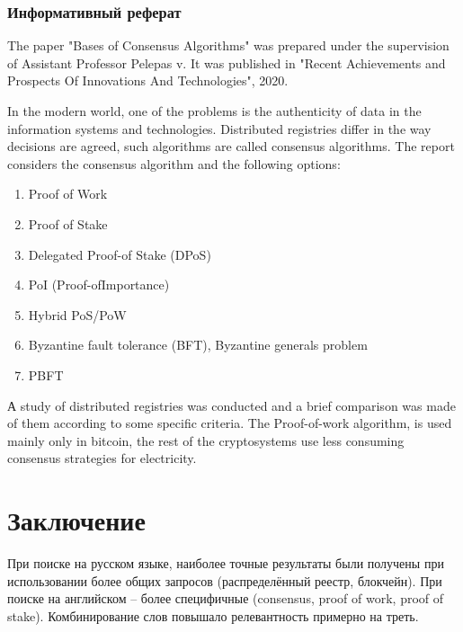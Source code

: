 \documentclass[a4paper, 12pt]{report}		%
\begin{document}
\subsection*{Информативный реферат}
The paper "Bases of Consensus Algorithms" was prepared under the supervision of Assistant Professor Pelepas v. It was published in "Recent Achievements and Prospects Of Innovations And Technologies", 2020.

In the modern world, one of the problems is the authenticity of data in
the information systems and technologies. Distributed registries differ in the way decisions are agreed, such algorithms are called consensus algorithms. The report considers the consensus algorithm and the following options:
\begin{enumerate}
\item Proof of Work
\item Proof of Stake
\item Delegated Proof-of Stake (DPoS)
\item PoI (Proof-ofImportance)
\item Hybrid PoS/PoW
\item Byzantine fault tolerance (BFT), Byzantine generals problem
\item PBFT
\end{enumerate}

А study of distributed registries was conducted and a brief comparison was made of them according to some specific criteria. The Proof-of-work algorithm, is used mainly only in bitcoin, the rest of the cryptosystems use less consuming consensus strategies for electricity.

\chapter*{Заключение}

При поиске на русском языке, наиболее точные результаты были получены при использовании более общих запросов (распределённый реестр, блокчейн). При поиске на английском -- более специфичные (consensus, proof of work, proof of stake). Комбинирование слов повышало релевантность примерно на треть.
\end{document}
